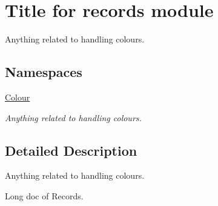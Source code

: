 \hypertarget{group__Colours}{}\section{Title for records module}
\label{group__Colours}


Anything related to handling colours.  


\subsection*{Namespaces}
\begin{DoxyCompactItemize}
\item 
 \hyperlink{namespaceColour}{Colour}
\begin{DoxyCompactList}\small\item\em Anything related to handling colours. \end{DoxyCompactList}\end{DoxyCompactItemize}


\subsection{Detailed Description}
Anything related to handling colours. 

Long doc of Records. 